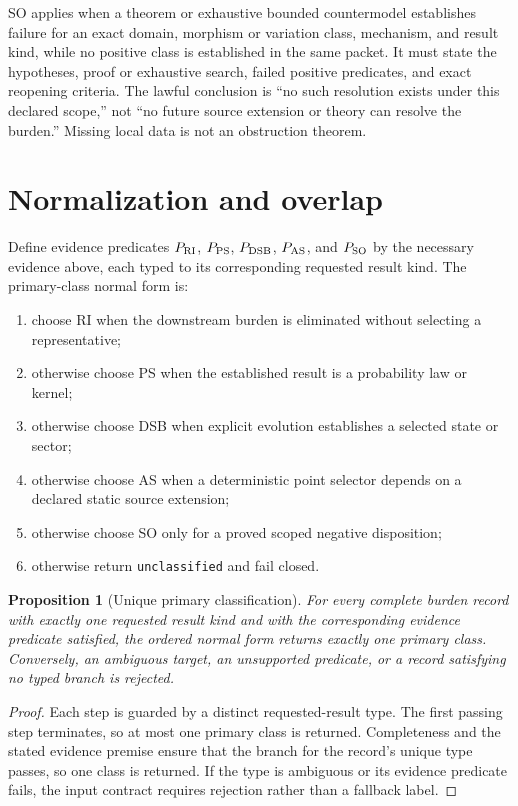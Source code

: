 \documentclass[11pt]{article}
\newtheorem{proposition}{Proposition}
\begin{document}
SO applies when a theorem or exhaustive bounded countermodel establishes
failure for an exact domain, morphism or variation class, mechanism, and
result kind, while no positive class is established in the same packet.  It
must state the hypotheses, proof or exhaustive search, failed positive
predicates, and exact reopening criteria.  The lawful conclusion is
``no such resolution exists under this declared scope,'' not ``no future
source extension or theory can resolve the burden.''  Missing local data is
not an obstruction theorem.

\section{Normalization and overlap}

Define evidence predicates $P_{\rm RI}$, $P_{\rm PS}$, $P_{\rm DSB}$,
$P_{\rm AS}$, and $P_{\rm SO}$ by the necessary evidence above, each typed to
its corresponding requested result kind.  The primary-class normal form is:
\begin{enumerate}[label=\arabic*.]
  \item choose RI when the downstream burden is eliminated without selecting
        a representative;
  \item otherwise choose PS when the established result is a probability law
        or kernel;
  \item otherwise choose DSB when explicit evolution establishes a selected
        state or sector;
  \item otherwise choose AS when a deterministic point selector depends on a
        declared static source extension;
  \item otherwise choose SO only for a proved scoped negative disposition;
  \item otherwise return \texttt{unclassified} and fail closed.
\end{enumerate}

\begin{proposition}[Unique primary classification]
For every complete burden record with exactly one requested result kind and
with the corresponding evidence predicate satisfied, the ordered normal form
returns exactly one primary class.  Conversely, an ambiguous target, an
unsupported predicate, or a record satisfying no typed branch is rejected.
\end{proposition}

\begin{proof}
Each step is guarded by a distinct requested-result type.  The first passing
step terminates, so at most one primary class is returned.  Completeness and
the stated evidence premise ensure that the branch for the record's unique
type passes, so one class is returned.  If the type is ambiguous or its
evidence predicate fails, the input contract requires rejection rather than a
fallback label.
\end{proof}
\end{document}

